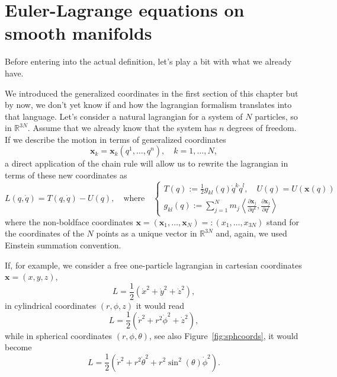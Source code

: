 \documentclass[english,fontsize=11pt,paper=a5,oneside]{scrbook}
\newcommand{\R}{\mathbb{R}}
\newcommand{\bx}{\bm{x}}
\newcommand{\lag}{\langle}
\newcommand{\rag}{\rangle}
\theoremstyle{definition}
\begin{document}
\section{Euler-Lagrange equations on smooth manifolds}\label{sec:lagrangianonmanifold}

Before entering into the actual definition, let's play a bit with what we already have.

We introduced the generalized coordinates in the first section of this chapter but by now, we don't yet know if and how the lagrangian formalism translates into that language.
Let's consider a natural lagrangian for a system of $N$ particles, so in $\R^{3N}$.
Assume that we already know that the system has $n$ degrees of freedom.
If we describe the motion in terms of generalized coordinates
\begin{equation}
  \bx_k = \bx_k(q^1, \ldots, q^{n}), \quad k=1,\ldots,N,
\end{equation}
a direct application of the chain rule will allow us to rewrite the lagrangian in terms of these new coordinates as
\begin{equation}
  L(q, \dot q) = T(q, \dot q) - U(q),
  \quad\mbox{where}\quad
  \begin{cases}
    T(q):= \frac12 g_{kl}(q)\dot q^k \dot q^l, \quad U(q) = U(\bx(q)) \\
  g_{kl} (q) := \sum_{j=1}^{N} m_{j} \left\lag\frac{\partial \bx_j}{\partial q^k}, \frac{\partial \bx_j}{\partial q^l}\right\rag
  \end{cases}
\end{equation}
where the non-boldface coordinates $\bx = (\bx_1, \ldots, \bx_N) =: (x_1, \ldots, x_{3N})$ stand for the coordinates of the $N$ points as a unique vector in $\R^{3N}$ and, again, we used Einstein summation convention.

If, for example, we consider a free one-particle lagrangian in cartesian coordinates $\bx = (x,y,z)$,
\begin{equation}
  L = \frac 12 (\dot x^2 + \dot y^2 + \dot z^2),
\end{equation}
in cylindrical coordinates $(r,\phi,z)$ it would read
\begin{equation}
  L = \frac 12 (\dot r^2 + r^2 \dot \phi^2 + \dot z^2),
\end{equation}
while in spherical coordinates $(r,\phi,\theta)$, see also Figure~\ref{fig:sphcoords}, it would become
\begin{equation}
  L = \frac 12 (\dot r^2 + r^2 \dot \theta^2 + r^2 \sin^2(\theta) \dot \phi^2).
\end{equation}
\end{document}
